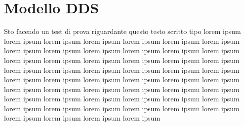 \section{Modello DDS}
Sto facendo un test di prova riguardante questo testo scritto
tipo lorem ipsum lorem ipsum lorem ipsum lorem ipsum lorem ipsum
lorem ipsum lorem ipsum lorem ipsum lorem ipsum lorem ipsum lorem ipsum
lorem ipsum lorem ipsum lorem ipsum lorem ipsum lorem ipsum lorem ipsum
lorem ipsum lorem ipsum lorem ipsum lorem ipsum lorem ipsum lorem ipsum
lorem ipsum lorem ipsum lorem ipsum lorem ipsum lorem ipsum lorem ipsum
lorem ipsum lorem ipsum lorem ipsum lorem ipsum lorem ipsum lorem ipsum
lorem ipsum lorem ipsum lorem ipsum lorem ipsum lorem ipsum lorem ipsum
lorem ipsum lorem ipsum lorem ipsum lorem ipsum lorem ipsum lorem ipsum
lorem ipsum lorem ipsum lorem ipsum lorem ipsum lorem ipsum lorem ipsum